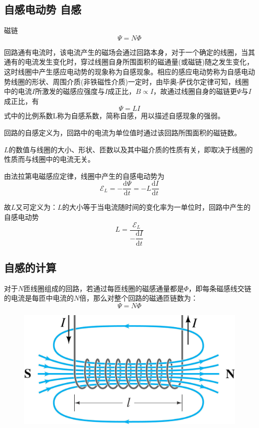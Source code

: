 \documentclass[12pt]{article}
\newcommand{\rmd}{\mathrm{d}}
\newcommand{\deriv}[2]{\frac{\rmd #1}{\rmd #2}}
\newcommand{\dderiv}[2]{\dfrac{\rmd #1}{\rmd #2}}
\begin{document}
\subsection{自感电动势 \quad 自感}

磁链
\begin{equation}
    \varPsi = N \varPhi
\end{equation}

回路通有电流时，该电流产生的磁场会通过回路本身，对于一个确定的线圈，当其通有的电流发生变化时，穿过线圈自身所围面积的磁通量(或磁链)随之发生变化，这时线圈中产生感应电动势的现象称为自感现象。相应的感应电动势称为自感电动势线圈的形状、周围介质(非铁磁性介质)一定时，由毕奥-萨伐尔定律可知，线圈中的电流\(I\)所激发的磁感应强度与\(I\)成正比，\(B \propto I\)，故通过线圈自身的磁链更\(\varPsi\)与\(I\)成正比，有
\begin{equation}
    \varPsi = L I
\end{equation}
式中的比例系数L称为自感系数，简称自感，用以描述自感现象的强弱。

回路的自感定义为，回路中的电流为单位值时通过该回路所围面积的磁链数。

\(L\)的数值与线圈的大小、形状、匝数以及其中磁介质的性质有关，即取决于线圈的性质而与线圈中的电流无关。

由法拉第电磁感应定律，线圈中产生的自感电动势为
\begin{equation}
    \mathcal{E}_L = -\deriv{\varPsi}{t} = - L \deriv{I}{t}
\end{equation}

故\(L\)又可定义为：\(L\)的大小等于当电流随时间的变化率为一单位时，回路中产生的自感电动势
\begin{equation}
    L = \frac{\mathcal{E}_L}{-\dderiv{I}{t}}
\end{equation}

\subsection{自感的计算}

对于\(N\)匝线圈组成的回路，若通过每匝线圈的磁感通量都是\(\varPhi\)，即每条磁感线交链的电流是每匝中电流的\(N\)倍，那么对整个回路的磁通匝链数为：
\begin{equation}
    \varPsi = N \varPhi
\end{equation}

\begin{figure}[!h]
    \centering
    \includegraphics[width = .3\textwidth]{graphics/自感系数的计算.png}
\end{figure}
\end{document}
